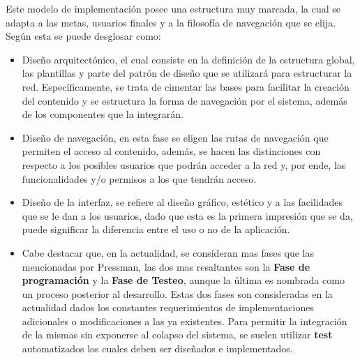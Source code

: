 Este modelo de implementación posee una estructura muy marcada, la cual se adapta
a las metas, usuarios finales y a la filosofía de navegación que se elija.
Según \cite{pressman2002} esta se puede desglosar como:

\begin{itemize}
    \item Diseño arquitectónico, el cual consiste en la definición de la
        estructura global, las plantillas y parte del patrón de diseño que se
        utilizará para estructurar la red. Específicamente, se trata de cimentar
        las bases para facilitar la creación del contenido y se estructura la
        forma de navegación por el sistema, además de los componentes que la
        integrarán.

    \item Diseño de navegación, en esta fase se eligen las rutas de navegación
        que permiten el acceso al contenido, además, se hacen las distinciones
        con respecto a los posibles usuarios que podrán acceder a la red y,
        por ende, las funcionalidades y/o permisos a los que tendrán acceso.

    \item Diseño de la interfaz, se refiere al diseño gráfico, estético y a
        las facilidades que se le dan a los usuarios, dado que esta es la primera
        impresión que se da, puede significar la diferencia entre el uso o no de
        la aplicación.

    \item Cabe destacar que, en la actualidad, se consideran mas fases que las
        mencionadas por Pressman, las dos mas resaltantes son la
        \textbf{Fase de programación} y la \textbf{Fase de Testeo}, aunque la
        última es nombrada como un proceso posterior al desarrollo. Estas dos
        fases son consideradas en la actualidad dados los constantes requerimientos
        de implementaciones adicionales o modificaciones a las ya existentes.
        Para permitir la integración de la mismas sin exponerse al colapso del
        sistema, se suelen utilizar \textbf{test} automatizados los cuales deben
        ser diseñados e implementados.

\end{itemize}
